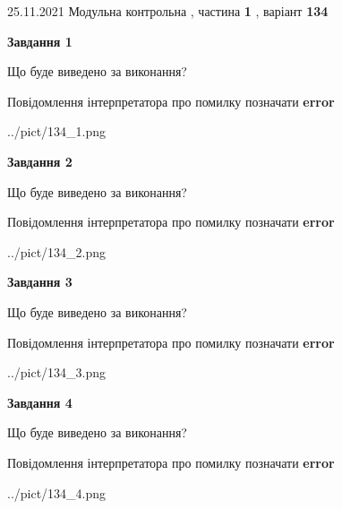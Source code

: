 \documentclass[10pt, ukrainian]{article}
\begin{document}
{25.11.2021 Модульна контрольна , частина \textbf { 1 }, варіант  \No \textbf { 134 }\par}
{
\begin {large}

{\begin {center}\textbf{Завдання 1}\end {center}}\par
Що буде виведено за виконання? \par
Повідомлення інтерпретатора про помилку позначати \textbf{error}

\begin{center}
	{../pict/134_1.png}
\end{center}
\newpage

{\begin {center}\textbf{Завдання 2}\end {center}}\par
Що буде виведено за виконання? \par
Повідомлення інтерпретатора про помилку позначати \textbf{error}

\begin{center}
	{../pict/134_2.png}
\end{center}
\newpage

{\begin {center}\textbf{Завдання 3}\end {center}}\par
Що буде виведено за виконання? \par
Повідомлення інтерпретатора про помилку позначати \textbf{error}

\begin{center}
	{../pict/134_3.png}
\end{center}
\newpage

{\begin {center}\textbf{Завдання 4}\end {center}}\par
Що буде виведено за виконання? \par
Повідомлення інтерпретатора про помилку позначати \textbf{error}

\begin{center}
	{../pict/134_4.png}
\end{center}
\newpage


\end{large}}
\end{document}
